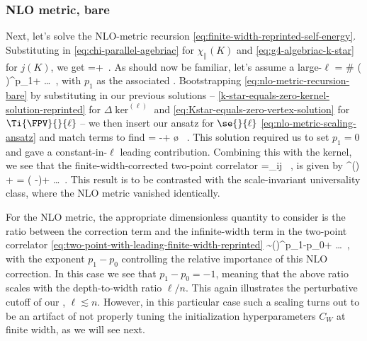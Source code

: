\subsubsection{NLO metric, bare}
Next, let's solve the NLO-metric recursion \eqref{eq:finite-width-reprinted-self-energy}. 
Substituting in \eqref{eq:chi-parallel-agebriac} for $\chi_{\parallel}(K)$ and \eqref{eq:g4-algebriac-k-star} for $j(K)$, we get
\be\label{eq:nlo-metric-recursion-bare}
=\se{}{\ell} +\Ti{\FPV}{}{\ell}\, .
\ee
As should now be familiar, let's assume a large-$\ell$ 
\be\label{eq:nlo-metric-scaling-ansatz}
\se{}{\ell}= \# \le(  \ri)^{p_1}+ \ldots \, ,
\ee
with $p_1$ as the associated .
Bootstrapping \eqref{eq:nlo-metric-recursion-bare} by substituting in our previous solutions -- \eqref{k-star-equals-zero-kernel-solution-reprinted} for $\Delta\ker^{(\ell)}$  and \eqref{eq:Kstar-equals-zero-vertex-solution} for $\Ti{\FPV}{}{\ell}$ -- we then insert our ansatz  for $\se{}{\ell}$ \eqref{eq:nlo-metric-scaling-ansatz} and match terms to find 
\be\label{eq:k-star-equal-zero-self-energy}
\se{}{\ell}= -\le[\frac{1}{3(-a_1)}\ri]+ \o{\frac{\log \le(\ell\ri)}{\ell}} \, .
\ee
This solution required us to set $p_1 = 0$ and gave a constant-in-$\ell$ leading contribution.
Combining this with the kernel, we see that the finite-width-corrected two-point correlator 
\be\label{eq:two-point-with-leading-finite-width-reprinted}
=\delta_{ij}  \, ,
\ee
is given by
\be\label{eq:k-star-full-two-point-with-self-energy}
\ker^{(\ell)} + \se{}{\ell} = \le[\frac{1}{(-a_1)}\ri]\le( -\ri)+ \ldots\, . %
\ee
This result is to be contrasted with the scale-invariant universality class, where the NLO metric vanished identically. 

For the NLO metric, the appropriate dimensionless quantity to consider is the ratio between the correction term and the infinite-width term in the two-point correlator \eqref{eq:two-point-with-leading-finite-width-reprinted}
\be\label{eq:nlo-dimensionless-ratio}
\frac{\se{}{\ell}}{\ker^{(\ell)}} \sim  {}\le(\ri)^{p_1-p_0}+ \dots \, ,
\ee
with the exponent $p_1 - p_0$ controlling the relative importance of this NLO correction. In this case we see that $p_1-p_0=-1$, meaning that the above ratio scales with the depth-to-width ratio $\ell/n$.
This again illustrates the perturbative cutoff of our , $\ell \lesssim n$.
However, in this particular case such a scaling turns out to be an artifact of not properly tuning the initialization hyperparameters $C_W$ at finite width, as we will see next.



